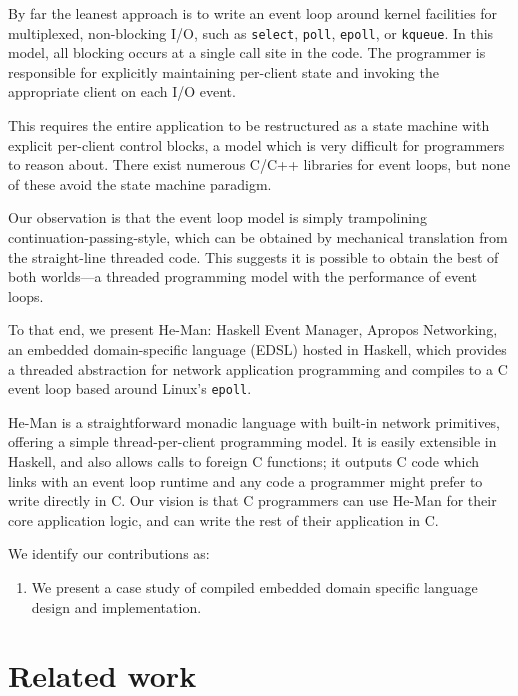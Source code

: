 \documentclass[preprint]{sigplanconf}
\renewcommand{\t}{\texttt}
\begin{document}
By far the leanest approach is to write an event loop around kernel facilities
for multiplexed, non-blocking I/O, such as \t{select}, \t{poll}, \t{epoll}, or
\t{kqueue}. In this model, all blocking occurs at a single call site in the
code. The programmer is responsible for explicitly maintaining per-client state
and invoking the appropriate client on each I/O event.

This requires the entire application to be restructured as a state machine with
explicit per-client control blocks, a model which is very difficult for
programmers to reason about. There exist numerous C/C++ libraries for event
loops, but none of these avoid the state machine paradigm.

Our observation is that the event loop model is simply trampolining
continuation-passing-style, %
which can be obtained by mechanical translation from the straight-line threaded
code. This suggests it is possible to obtain the best of both worlds---a
threaded programming model with the performance of event loops. 

To that end, we present He-Man: Haskell Event Manager, Apropos Networking, an
embedded domain-specific language (EDSL) hosted in Haskell, which provides a
threaded abstraction for network application programming and compiles to a C
event loop based around Linux's \t{epoll}.

He-Man is a straightforward monadic language with built-in network primitives,
offering a simple thread-per-client programming model. It is easily extensible
in Haskell, and also allows calls to foreign C functions; it outputs C code
which links with an event loop runtime and any code a programmer might prefer to
write directly in C. Our vision is that C programmers can use He-Man for their
core application logic, and can write the rest of their application in C. 

We identify our contributions as:
\begin{enumerate}

\item We present a case study of compiled embedded domain specific
  language design and implementation.
\end{enumerate}


\section{Related work}
\end{document}
